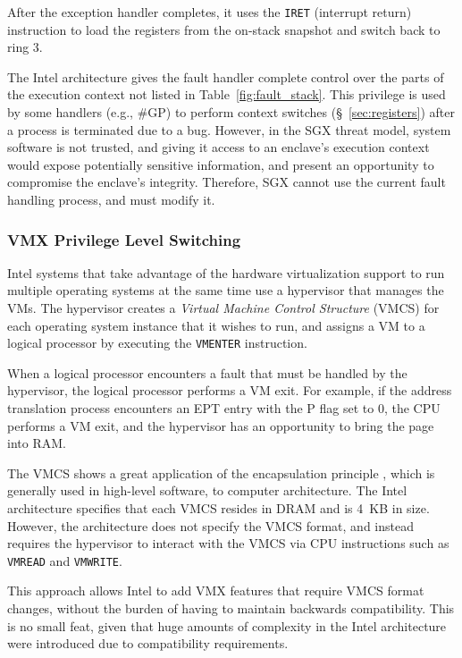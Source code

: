 After the exception handler completes, it uses the \texttt{IRET} (interrupt
return) instruction to load the registers from the on-stack snapshot and switch
back to ring 3.

The Intel architecture gives the fault handler complete control over the parts
of the execution context not listed in Table~\ref{fig:fault_stack}. This
privilege is used by some handlers (e.g., \#GP) to perform context switches
(\S~\ref{sec:registers}) after a process is terminated due to a bug. However,
in the SGX threat model, system software is not trusted, and giving it access
to an enclave's execution context would expose potentially sensitive
information, and present an opportunity to compromise the enclave's integrity.
Therefore, SGX cannot use the current fault handling process, and must modify
it.


\subsubsection{VMX Privilege Level Switching}
\label{sec:vmx}


Intel systems that take advantage of the hardware virtualization support to run
multiple operating systems at the same time use a hypervisor that manages the
VMs. The hypervisor creates a \textit{Virtual Machine Control Structure} (VMCS)
for each operating system instance that it wishes to run, and assigns a VM to a
logical processor by executing the \texttt{VMENTER} instruction.


When a logical processor encounters a fault that must be handled by the
hypervisor, the logical processor performs a VM exit. For example, if the
address translation process encounters an EPT entry with the P flag set to 0,
the CPU performs a VM exit, and the hypervisor has an opportunity to bring the
page into RAM.

The VMCS shows a great application of the encapsulation principle
\cite{liskov1974adt}, which is generally used in high-level software, to
computer architecture. The Intel architecture specifies that each VMCS resides
in DRAM and is 4~KB in size. However, the architecture does not specify the
VMCS format, and instead requires the hypervisor to interact with the VMCS via
CPU instructions such as \texttt{VMREAD} and \texttt{VMWRITE}.

This approach allows Intel to add VMX features that require VMCS format
changes, without the burden of having to maintain backwards compatibility.
This is no small feat, given that huge amounts of complexity in the Intel
architecture were introduced due to compatibility requirements.
